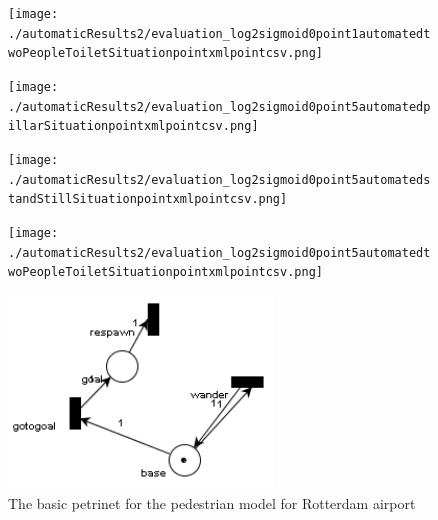 \documentclass[11pt]{book}
\begin{document}
\begin{figure}
\centering
\texttt{[image: ./automaticResults2/evaluation\_log2sigmoid0point1automatedtwoPeopleToiletSituationpointxmlpointcsv.png]}
\label{evaluation_log2sigmoid0point1automatedtwoPeopleToiletSituationpointxmlpointcsv}
\end{figure}

\begin{figure}
\centering
\texttt{[image: ./automaticResults2/evaluation\_log2sigmoid0point5automatedpillarSituationpointxmlpointcsv.png]}
\label{evaluation_log2sigmoid0point5automatedpillarSituationpointxmlpointcsv}
\end{figure}

\begin{figure}
\centering
\texttt{[image: ./automaticResults2/evaluation\_log2sigmoid0point5automatedstandStillSituationpointxmlpointcsv.png]}
\label{evaluation_log2sigmoid0point5automatedstandStillSituationpointxmlpointcsv}
\end{figure}
\clearpage

\begin{figure}
\centering
\texttt{[image: ./automaticResults2/evaluation\_log2sigmoid0point5automatedtwoPeopleToiletSituationpointxmlpointcsv.png]}
\label{evaluation_log2sigmoid0point5automatedtwoPeopleToiletSituationpointxmlpointcsv}
\end{figure}

\begin{figure}
\centering
\includegraphics[width=200pt]{rotterdamPedestrianNet}
\caption{The basic petrinet for the pedestrian model for Rotterdam airport}
\label{basicnet}
\end{figure}
\end{document}
